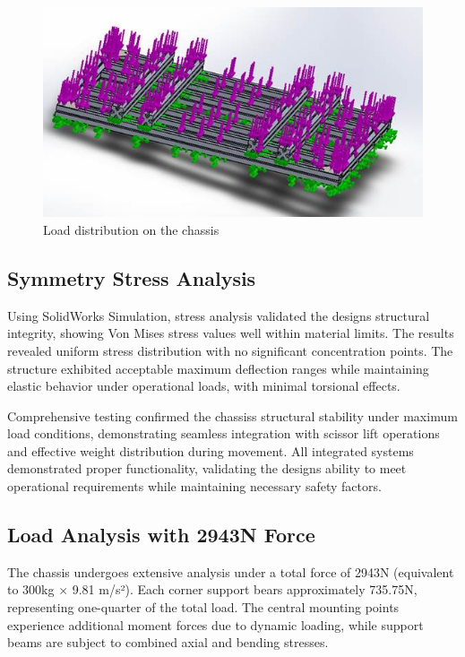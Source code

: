 \documentclass[../../main]{subfiles}
\begin{document}
\begin{figure}[h!]
  \centering
  \includegraphics[width=\textwidth]{img/image122.jpg}
  \caption{Load distribution on the chassis}
  \end{figure}

\subsection{Symmetry Stress Analysis}\label{symmetry-stress-analysis}

Using SolidWorks Simulation, stress analysis validated the
design\textquotesingle s structural integrity, showing Von Mises stress
values well within material limits. The results revealed uniform stress
distribution with no significant concentration points. The structure
exhibited acceptable maximum deflection ranges while maintaining elastic
behavior under operational loads, with minimal torsional effects.

Comprehensive testing confirmed the chassis\textquotesingle s structural
stability under maximum load conditions, demonstrating seamless
integration with scissor lift operations and effective weight
distribution during movement. All integrated systems demonstrated proper
functionality, validating the design\textquotesingle s ability to meet
operational requirements while maintaining necessary safety factors.

\subsection{Load Analysis with 2943N
Force}\label{load-analysis-with-2943n-force}

The chassis undergoes extensive analysis under a total force of 2943N
(equivalent to 300kg × 9.81 m/s²). Each corner support bears
approximately 735.75N, representing one-quarter of the total load. The
central mounting points experience additional moment forces due to
dynamic loading, while support beams are subject to combined axial and
bending stresses.
\end{document}
